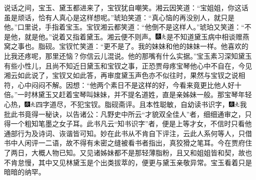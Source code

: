 说话之间，宝玉、黛玉都进来了，宝钗犹自嘲笑。湘云因笑道：``宝姐姐，你这话虽是顽话，恰有人真心是这样想呢。''琥珀笑道：``真心恼的再没别人，就只是他。''口里说，手指着宝玉。宝钗湘云都笑道：``他倒不是这样人。''琥珀又笑道：``不是他，就是他。''说着又指着黛玉。湘云便不则声。{\includegraphics[width=3mm]{../Images/00004}\includegraphics[width=3mm]{../Images/00012}\footnotesize \kaishu 是不知道黛玉病中相谈赠燕窝之事也。脂砚。}宝钗忙笑道：``更不是了。我的妹妹和他的妹妹一样。他喜欢的比我还疼呢，那里还恼？你信云儿混说。他的那嘴有什么实据。''宝玉素习深知黛玉有些小性儿，且尚不知近日黛玉和宝钗之事，正恐贾母疼宝琴他心中不自在，今见湘云如此说了，宝钗又如此答，再审度黛玉声色亦不似往时，果然与宝钗之说相符，心中闷闷不解。因想：``他两个素日不是这样的好，今看来竟更比他人好十倍。''一时林黛玉又赶着宝琴叫妹妹，并不提名道姓，直是亲姊妹一般。那宝琴年轻心热，{\includegraphics[width=3mm]{../Images/00004}\includegraphics[width=3mm]{../Images/00012}\footnotesize \kaishu 四字道尽，不犯宝钗。脂砚斋评。}且本性聪敏，自幼读书识字，{\includegraphics[width=3mm]{../Images/00004}\includegraphics[width=3mm]{../Images/00012}\footnotesize \kaishu 我批此书竟得一秘诀，以告诸公：凡野史中所云``才貌双全佳人''者，细细通审之，只得一个粗知笔墨之女子耳。此书凡云``知书识字''者，便是上等才女，不信时只看他通部行为及诗词、诙谐皆可知。妙在此书从不肯自下评注，云此人系何等人，只借书中人闲评一二语，故不得有未密之缝被看书者指出，真狡猾之笔耳。}今在贾府住了两日，大概人物已知。又见诸姊妹都不是那轻薄脂粉，且又和姐姐皆和契，故也不肯怠慢，其中又见林黛玉是个出类拔萃的，便更与黛玉亲敬异常。宝玉看着只是暗暗的纳罕。

